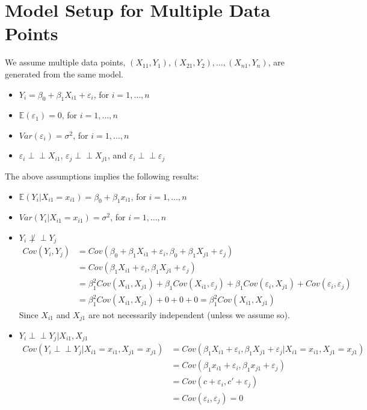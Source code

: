 \documentclass{article}
\newcommand{\indep}{\perp \!\!\! \perp}
\newcommand{\E}{\mathbb{E}}
\begin{document}
\section{Model Setup for Multiple Data Points}
We assume multiple data points, $(X_{11},Y_1), (X_{21}, Y_2), \ldots, (X_{n1},Y_n)$, are generated from the same model.
\begin{itemize}
    \item $Y_i = \beta_0 + \beta_1X_{i1} + \varepsilon_i$, for $i = 1,\ldots,n$
    \item $\E(\varepsilon_1) = 0$, for $i = 1,\ldots,n$
    \item $Var(\varepsilon_i) = \sigma^2$, for $i = 1,\ldots,n$
    \item $\varepsilon_i \indep X_{i1}$, $\varepsilon_j \indep X_{j1}$, and $\varepsilon_i \indep \varepsilon_j$
\end{itemize}
The above assumptions implies the following results:
\begin{itemize}
    \item $\E(Y_i | X_{i1} = x_{i1}) = \beta_0 + \beta_1x_{i1}$, for $i = 1,\ldots,n$
    \item $Var(Y_i | X_{i1} = x_{i1}) = \sigma^2$, for $i = 1,\ldots,n$
    \item $Y_i \not\indep Y_j$
    \begin{align}
        Cov(Y_i,Y_j) &= Cov(\beta_0 + \beta_1X_{i1} + \varepsilon_i, \beta_0 + \beta_1X_{j1} + \varepsilon_j)\\
        &= Cov(\beta_1X_{i1} + \varepsilon_i, \beta_1X_{j1}+ \varepsilon_j)\\
        &= \beta_1^2Cov(X_{i1},X_{j1}) + \beta_1Cov(X_{i1}, \varepsilon_j) + \beta_1Cov(\varepsilon_i, X_{j1}) + Cov(\varepsilon_i,\varepsilon_j)\\
        &= \beta_1^2Cov(X_{i1},X_{j1}) + 0 + 0 + 0 = \beta_1^2Cov(X_{i1},X_{j1})
    \end{align}
    Since $X_{i1}$ and $X_{j1}$ are not necessarily independent (unless we assume so).
    \item $Y_i \indep Y_j | X_{i1},X_{j1}$
    \begin{align}
        Cov(Y_i \indep Y_j |X_{i1} = x_{i1}, X_{j1} = x_{j1}) &= Cov(\beta_1X_{i1} + \varepsilon_i, \beta_1X_{j1}+ \varepsilon_j | X_{i1} = x_{i1}, X_{j1} = x_{j1})\\
        &= Cov(\beta_1x_{i1} + \varepsilon_i, \beta_1x_{j1}+ \varepsilon_j)\\
        &= Cov(c + \varepsilon_i, c'+ \varepsilon_j)\\
        &= Cov(\varepsilon_i,\varepsilon_j) = 0
    \end{align}
\end{itemize}
\end{document}
